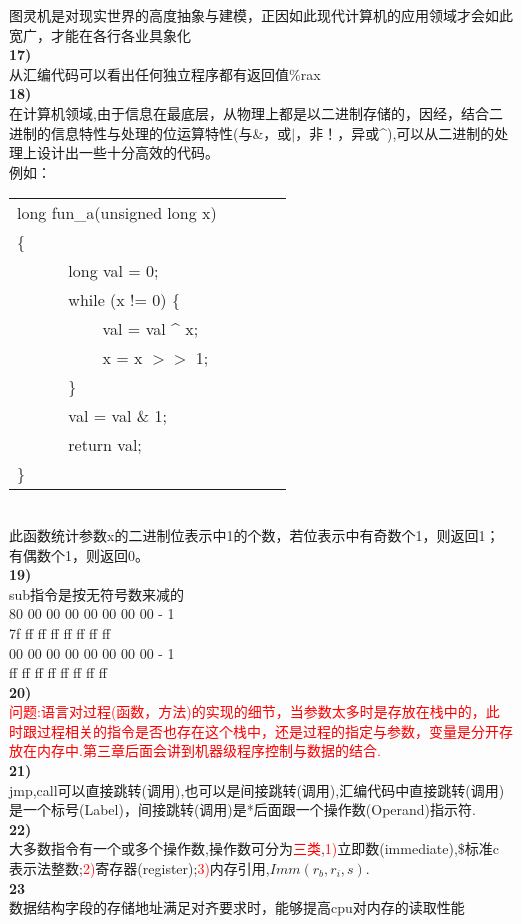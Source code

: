 \documentclass{article}
\newcommand{\red}[1]{\textcolor{red}{#1}}
\begin{document}
\begin{CJK}{UTF8}{uyhei}
图灵机是对现实世界的高度抽象与建模，正因如此现代计算机的应用领域才会如此宽广，才能在各行各业具象化	\\
\textbf{17)}	\\
从汇编代码可以看出任何独立程序都有返回值\%rax	\\
\textbf{18)}	\\
在计算机领域,由于信息在最底层，从物理上都是以二进制存储的，因经，结合二进制的信息特性与处理的位运算特性(与\&，或$|$，非！，异或\^{}),可以从二进制的处理上设计出一些十分高效的代码。	\\
例如：	\\[-2ex]
\begin{table}[ht]
\begin{tabular}{m{2em}m{2em}m{2em}l}
	\multicolumn{3}{l}{long fun\_a(unsigned long x)}	\\
\{	\\
	&	\multicolumn{3}{l}{long val = 0;}	\\
	&	\multicolumn{3}{l}{ while (x != 0) \{ } 	\\
	&	&	\multicolumn{2}{l}{val = val \^{} x;}	\\
	&	&	\multicolumn{2}{l}{x = x $>>$ 1;}	\\
	&	\multicolumn{3}{l}{ \} } 	\\
	&	\multicolumn{3}{l}{val = val \& 1;} 	\\
	&	\multicolumn{3}{l}{return val;} 	\\
\}	\\
\end{tabular}
\end{table}	\\
此函数统计参数x的二进制位表示中1的个数，若位表示中有奇数个1，则返回1；有偶数个1，则返回0。	\\[1ex]
\textbf{19)}	\\
sub指令是按无符号数来减的	\\
80 00 00 00 00 00 00 00 - 1	\\
7f ff ff ff ff ff ff ff		\\[2ex]
00 00 00 00 00 00 00 00 - 1	\\
ff ff ff ff ff ff ff ff		\\[1ex]
\textbf{20)}	\\
\red{ 问题:语言对过程(函数，方法)的实现的细节，当参数太多时是存放在栈中的，此时跟过程相关的指令是否也存在这个栈中，还是过程的指定与参数，变量是分开存放在内存中.第三章后面会讲到机器级程序控制与数据的结合. }	\\[1ex]
\textbf{21)}	\\
jmp,call可以直接跳转(调用),也可以是间接跳转(调用),汇编代码中直接跳转(调用)是一个标号(Label)，间接跳转(调用)是*后面跟一个操作数(Operand)指示符.	\\[1ex]
\textbf{22)}	\\
大多数指令有一个或多个操作数,操作数可分为\red{三类},\red{1)}立即数(immediate),\$标准c表示法整数;\red{2)}寄存器(register);\red{3)}内存引用,$Imm(r_b, r_i, s)$.	\\
\textbf{23}	\\
数据结构字段的存储地址满足对齐要求时，能够提高cpu对内存的读取性能

\end{CJK}
\end{document}

